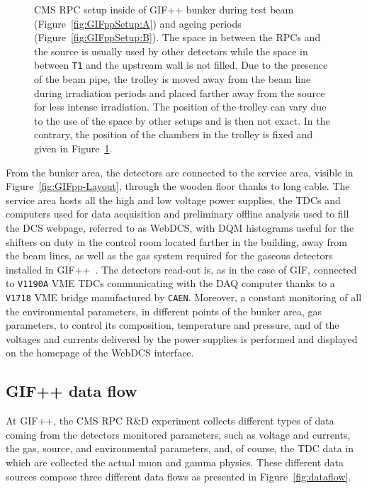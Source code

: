 \begin{figure}[H]
\begin{subfigure}{\linewidth}
        	\caption{\label{fig:GIFppSetup:C}}
    	\end{subfigure}
		\caption{\label{fig:GIFppSetup} CMS RPC setup inside of GIF++ bunker during test beam (Figure~\ref{fig:GIFppSetup:A}) and ageing periods (Figure~\ref{fig:GIFppSetup:B}). The space in between the RPCs and the source is usually used by other detectors while the space in between \texttt{T1} and the upstream wall is not filled. Due to the presence of the beam pipe, the trolley is moved away from the beam line during irradiation periods and placed farther away from the source for less intense irradiation. The position of the trolley can vary due to the use of the space by other setups and is then not exact. In the contrary, the position of the chambers in the trolley is fixed and given in Figure~\ref{fig:GIFppSetup:C}.}
	\end{figure}
	
	From the bunker area, the detectors are connected to the service area, visible in Figure~\ref{fig:GIFpp-Layout}, through the wooden floor thanks to long cable. The service area hosts all the high and low voltage power supplies, the TDCs and computers used for data acquisition and preliminary offline analysis used to fill the \acf{DCS} webpage, referred to as WebDCS, with \acf{DQM} histograms useful for the shifters on duty in the control room located farther in the building, away from the beam lines, as well as the gas system required for the gaseous detectors installed in GIF++~\cite{WEBDCS}. The detectors read-out is, as in the case of GIF, connected to \texttt{V1190A} VME TDCs communicating with the DAQ computer thanks to a \texttt{V1718} VME bridge manufactured by \texttt{CAEN}. Moreover, a constant monitoring of all the environmental parameters, in different points of the bunker area, gas parameters, to control its composition, temperature and pressure, and of the voltages and currents delivered by the power supplies is performed and displayed on the homepage of the WebDCS interface.

	\subsection{GIF++ data flow}
	\label{chapt5:ssec:dataflow}
	
	At GIF++, the CMS RPC R\&D experiment collects different types of data coming from the detectors monitored parameters, such as voltage and currents, the gas, source, and environmental parameters, and, of course, the TDC data in which are collected the actual muon and gamma physics. These different data sources compose three different data flows as presented in Figure~\ref{fig:dataflow}.

